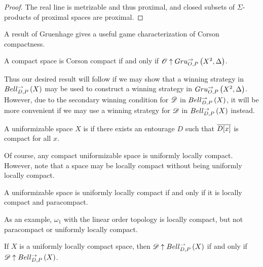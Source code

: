 \begin{proof}
  The real line is metrizable and thus proximal, and closed subsets of
  $\Sigma$-products of proximal spaces are proximal.
\end{proof}

A result of Gruenhage
\cite{MR752278} gives a useful game characterization of Corson compactness.

\begin{thm}
  A compact space is Corson compact if and only if
  $\mathscr{O} \uparrow Gru_{O,P}^{\to}\left({X^2},{\Delta}\right)$.
\end{thm}

Thus our desired result will follow if we may show that a winning strategy
in $Bell_{D,P}^{\rightharpoonup}\left({X}\right)$ may be used to construct a winning strategy in
$Gru_{O,P}^{\to}\left({X^2},{\Delta}\right)$. However, due to the secondary winning condition
for $\mathscr{D}$ in $Bell_{D,P}^{\rightharpoonup}\left({X}\right)$,
it will be more convenient if we may use a winning strategy for $\mathscr{D}$
in $Bell_{D,P}^{\to}\left({X}\right)$ instead.

\begin{defn}
  A uniformizable space $X$ is  if there
  exists an entourage $D$ such that $\overline{D[x]}$ is compact
  for all $x$.
\end{defn}

Of course, any compact uniformizable space is uniformly locally compact.
However, note that a space may be locally compact without being uniformly
locally compact.

\begin{thm}
  A uniformizable space is uniformly locally compact if and only if it is
  locally compact and paracompact. \cite{MR2040233}
\end{thm}

As an example, $\omega_1$ with the linear order topology is locally compact,
but not paracompact or uniformly locally compact.

\begin{thm}
  If $X$ is a uniformly locally compact space, then
  $\mathscr{D} \uparrow Bell_{D,P}^{\rightharpoonup}\left({X}\right)$ if and only if
  $\mathscr{D} \uparrow Bell_{D,P}^{\to}\left({X}\right)$.
\end{thm}

